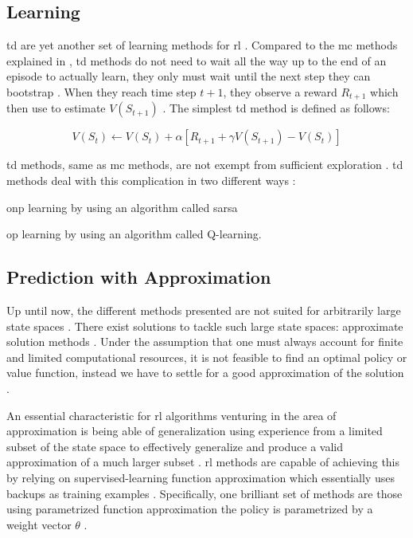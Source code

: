 \subsection{ Learning}
\label{subsec:td_learning}

\gls{td} are yet another set of learning methods for \gls{rl} \citep{Sutton2017}. Compared to the \gls{mc} methods explained in , \gls{td} methods do not need to wait all the way up to the end of an episode to actually learn, they only must wait until the next step \ie they can bootstrap \citep[p. 128]{Sutton2017}. When they reach time step $t+1$, they observe a reward $R_{t+1}$ which then use to estimate $V(S_{t+1})$ \citep[p. 128]{Sutton2017}. The simplest \gls{td} method is defined as follows:

\begin{equation}
\label{eq:td_update}
	V(S_t) \leftarrow V(S_t) + \alpha [R_{t+1} + \gamma V(S_{t+1}) - V(S_t)]
\end{equation}

\gls{td} methods, same as \gls{mc} methods, are not exempt from sufficient exploration \citep[p. 147]{Sutton2017}. \gls{td} methods deal with this complication in two different ways \citep[p. 128]{Sutton2017}:
\begin{enumerate*}
	\item \gls{onp} learning by using an algorithm called \gls{sarsa}
	\item \gls{op} learning by using an algorithm called Q-learning.
\end{enumerate*}

\subsection{ Prediction with Approximation}
\label{subsec:onpol_pred}

Up until now, the different methods presented are not suited for arbitrarily large state spaces \citep{Sutton2017}. There exist solutions to tackle such large state spaces: approximate solution methods \citep{Sutton2017}. Under the assumption that one must always account for finite and limited computational resources, it is not feasible to find an optimal policy or value function, instead we have to settle for a good approximation of the solution \citep[p. 189]{Sutton2017}.

An essential characteristic for \gls{rl} algorithms venturing in the area of approximation is being able of generalization \ie using experience from a limited subset of the state space to effectively generalize and produce a valid approximation of a much larger subset  \citep[p. 189]{Sutton2017}. \gls{rl} methods are capable of achieving this by relying on supervised-learning function approximation which essentially uses backups as training examples \citep[p. 222]{Sutton2017}. Specifically, one brilliant set of methods are those using parametrized function approximation \ie the policy is parametrized by a weight vector $\theta$ \citep{Sutton2017}.

